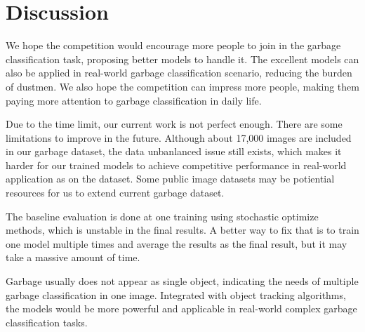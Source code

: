 \section{Discussion}

We hope the competition would encourage more people to join in the garbage classification task, proposing better models to handle it. The excellent models can also be applied in real-world garbage classification scenario, reducing the burden of dustmen. We also hope the competition can impress more people, making them paying more attention to garbage classification in daily life.

Due to the time limit, our current work is not perfect enough. There are some limitations to improve in the future. Although about 17,000 images are included in our garbage dataset, the data unbanlanced issue still exists, which makes it harder for our trained models to achieve competitive performance in real-world application as on the dataset. Some public image datasets may be potiential resources for us to extend current garbage dataset.

The baseline evaluation is done at one training using stochastic optimize methods, which is unstable in the final results. A better way to fix that is to train one model multiple times and average the results as the final result, but it may take a massive amount of time.

Garbage usually does not appear as single object, indicating the needs of multiple garbage classification in one image. Integrated with object tracking algorithms, the models would be more powerful and applicable in real-world complex garbage classification tasks. 